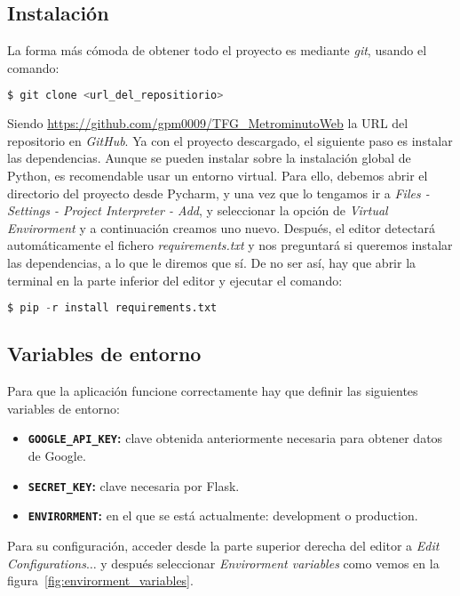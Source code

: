 \subsection{Instalación}
La forma más cómoda de obtener todo el proyecto es mediante \textit{git}, usando el comando:
\renewcommand{\lstlistingname}{Instalación}%
\renewcommand{\lstlistlistingname}{List of \lstlistingname s}
\begin{lstlisting}[language=python,caption={Descargar el repositorio.}]
 $ git clone <url_del_repositiorio>
\end{lstlisting}
Siendo \url{https://github.com/gpm0009/TFG_MetrominutoWeb} la URL del repositorio en \textit{GitHub}. Ya con el proyecto descargado, el siguiente paso es instalar las dependencias. Aunque se pueden instalar sobre la instalación global de Python, es recomendable usar un entorno virtual. Para ello, debemos abrir el directorio del proyecto desde Pycharm, y una vez que lo tengamos ir a \textit{Files - Settings - Project Interpreter - Add}, y seleccionar la opción de \textit{Virtual Envirorment} y a continuación creamos uno nuevo.
Después, el editor detectará automáticamente el fichero \textit{requirements.txt} y nos preguntará si queremos instalar las dependencias, a lo que le diremos que sí. De no ser así, hay que abrir la terminal en la parte inferior del editor y ejecutar el comando:
\begin{lstlisting}[language=python,caption={Instalar dependencias en el entorno virtual.}]
$ pip -r install requirements.txt
\end{lstlisting}

\subsection{Variables de entorno}\label{variables_entorno}
Para que la aplicación funcione correctamente hay que definir las siguientes variables de entorno:
\begin{itemize}
	\item \textbf{\texttt{GOOGLE\_API\_KEY}:} clave obtenida anteriormente necesaria para obtener datos de Google.
	\item \textbf{\texttt{SECRET\_KEY}:} clave necesaria por Flask.
	\item \textbf{\texttt{ENVIRORMENT}:} en el que se está actualmente: development o production.
\end{itemize}
Para su configuración, acceder desde la parte superior derecha del editor a \textit{Edit Configurations$\dots$} y después seleccionar \textit{Envirorment variables} como vemos en la figura~\ref{fig:envirorment_variables}.

